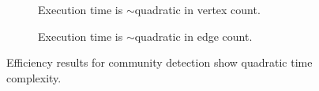 \begin{figure}[htbp]
    \centering
    \begin{subfigure}[b]{0.45\textwidth}  %
        \centering
        \caption{Execution time is $\sim$quadratic in vertex count.}
        \label{fig:vertex-efficency}
    \end{subfigure}
    \hfill
    \begin{subfigure}[b]{0.45\textwidth}  %
        \centering
        \caption{Execution time is $\sim$quadratic in edge count.}
        \label{fig:edge-efficency}
    \end{subfigure}
    \caption{Efficiency results for community detection show quadratic time complexity.}
    \label{fig:cd-results-efficency}
\end{figure}
